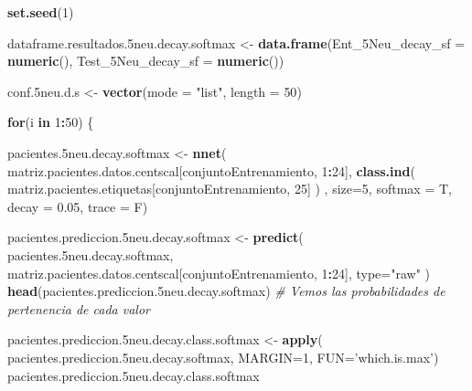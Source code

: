 \documentclass[]{article}
\newenvironment{Shaded}{\begin{snugshade}}{\end{snugshade}}
\newcommand{\CommentTok}[1]{\textcolor[rgb]{0.56,0.35,0.01}{\textit{#1}}}
\newcommand{\ControlFlowTok}[1]{\textcolor[rgb]{0.13,0.29,0.53}{\textbf{#1}}}
\newcommand{\DataTypeTok}[1]{\textcolor[rgb]{0.13,0.29,0.53}{#1}}
\newcommand{\DecValTok}[1]{\textcolor[rgb]{0.00,0.00,0.81}{#1}}
\newcommand{\FloatTok}[1]{\textcolor[rgb]{0.00,0.00,0.81}{#1}}
\newcommand{\KeywordTok}[1]{\textcolor[rgb]{0.13,0.29,0.53}{\textbf{#1}}}
\newcommand{\NormalTok}[1]{#1}
\newcommand{\OperatorTok}[1]{\textcolor[rgb]{0.81,0.36,0.00}{\textbf{#1}}}
\newcommand{\StringTok}[1]{\textcolor[rgb]{0.31,0.60,0.02}{#1}}
\begin{document}
\begin{Shaded}
\begin{Highlighting}[]
\KeywordTok{set.seed}\NormalTok{(}\DecValTok{1}\NormalTok{)}

\NormalTok{dataframe.resultados}\FloatTok{.5}\NormalTok{neu.decay.softmax <-}\StringTok{ }\KeywordTok{data.frame}\NormalTok{(}\DataTypeTok{Ent_5Neu_decay_sf =} \KeywordTok{numeric}\NormalTok{(),}
                                                      \DataTypeTok{Test_5Neu_decay_sf =} \KeywordTok{numeric}\NormalTok{())}

\NormalTok{conf}\FloatTok{.5}\NormalTok{neu.d.s <-}\StringTok{ }\KeywordTok{vector}\NormalTok{(}\DataTypeTok{mode =} \StringTok{"list"}\NormalTok{, }\DataTypeTok{length =} \DecValTok{50}\NormalTok{)}

\ControlFlowTok{for}\NormalTok{(i }\ControlFlowTok{in} \DecValTok{1}\OperatorTok{:}\DecValTok{50}\NormalTok{)}
\NormalTok{\{}


\NormalTok{  pacientes}\FloatTok{.5}\NormalTok{neu.decay.softmax <-}\StringTok{ }\KeywordTok{nnet}\NormalTok{( matriz.pacientes.datos.centscal[conjuntoEntrenamiento, }\DecValTok{1}\OperatorTok{:}\DecValTok{24}\NormalTok{],}
                                        \KeywordTok{class.ind}\NormalTok{( matriz.pacientes.etiquetas[conjuntoEntrenamiento, }\DecValTok{25}\NormalTok{] ) ,}
                                        \DataTypeTok{size=}\DecValTok{5}\NormalTok{,}
                                        \DataTypeTok{softmax =}\NormalTok{ T, }
                                        \DataTypeTok{decay =} \FloatTok{0.05}\NormalTok{,}
                                        \DataTypeTok{trace =}\NormalTok{ F)}
  
\NormalTok{  pacientes.prediccion}\FloatTok{.5}\NormalTok{neu.decay.softmax <-}\StringTok{ }\KeywordTok{predict}\NormalTok{( pacientes}\FloatTok{.5}\NormalTok{neu.decay.softmax, matriz.pacientes.datos.centscal[conjuntoEntrenamiento, }\DecValTok{1}\OperatorTok{:}\DecValTok{24}\NormalTok{], }\DataTypeTok{type=}\StringTok{"raw"}\NormalTok{ )}
  \KeywordTok{head}\NormalTok{(pacientes.prediccion}\FloatTok{.5}\NormalTok{neu.decay.softmax) }\CommentTok{# Vemos las probabilidades de pertenencia de cada valor}
  
\NormalTok{  pacientes.prediccion}\FloatTok{.5}\NormalTok{neu.decay.class.softmax <-}\StringTok{ }\KeywordTok{apply}\NormalTok{( pacientes.prediccion}\FloatTok{.5}\NormalTok{neu.decay.softmax, }\DataTypeTok{MARGIN=}\DecValTok{1}\NormalTok{, }\DataTypeTok{FUN=}\StringTok{'which.is.max'}\NormalTok{)}
\NormalTok{  pacientes.prediccion}\FloatTok{.5}\NormalTok{neu.decay.class.softmax}
  

\end{Highlighting}
\end{Shaded}
\end{document}
